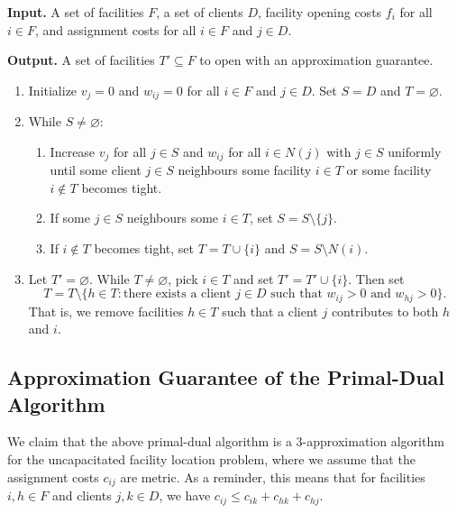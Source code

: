 \begin{mdframed}[
    linewidth=1pt,
    linecolor=black,
    bottomline=false,topline=false,rightline=false,
    innerrightmargin=0pt,innertopmargin=0pt,innerbottommargin=0pt,
    innerleftmargin=1em,%
    skipabove=0.75\baselineskip
]
{\bf Input.} A set of facilities $F$, a set of clients $D$, facility 
opening costs $f_i$ for all $i \in F$, and assignment costs for all 
$i \in F$ and $j \in D$.

{\bf Output.} A set of facilities $T' \subseteq F$ to open with 
an approximation guarantee.
\begin{enumerate}[leftmargin=1.75cm, label={Step \arabic*.}]
    \item Initialize $v_j = 0$ and $w_{ij} = 0$ for all $i \in F$ and $j \in D$. 
    Set $S = D$ and $T = \varnothing$. 

    \item While $S \neq \varnothing$:
    \begin{enumerate}[label={Step 2.\arabic*.}]
        \item Increase $v_j$ for all $j \in S$ and
        $w_{ij}$ for all $i \in N(j)$ with $j \in S$ uniformly 
        until some client $j \in S$ neighbours some facility $i \in T$ or 
        some facility $i \notin T$ becomes tight. 

        \item If some $j \in S$ neighbours some $i \in T$, set 
        $S = S \setminus \{j\}$. 

        \item If $i \notin T$ becomes tight, set $T = T \cup \{i\}$ and 
        $S = S \setminus N(i)$.
    \end{enumerate}

    \item Let $T' = \varnothing$. While $T \neq \varnothing$, pick $i \in T$ 
    and set $T' = T' \cup \{i\}$. Then set 
    \[ T = T \setminus \{h \in T : \text{there exists a client $j \in D$ 
    such that $w_{ij} > 0$ and $w_{hj} > 0$}\}. \] 
    That is, we remove facilities $h \in T$ such that a client $j$ 
    contributes to both $h$ and $i$. 
\end{enumerate}
\end{mdframed}\vspace{-0.25cm}

\subsection{Approximation Guarantee of the Primal-Dual Algorithm} \label{subsec:8.3}
We claim that the above primal-dual algorithm is a $3$-approximation algorithm for 
the uncapacitated facility location problem, where we assume 
that the assignment costs $c_{ij}$ are metric. As a reminder, 
this means that for facilities $i, h \in F$ and clients $j, k \in D$, we have 
$c_{ij} \leq c_{ik} + c_{hk} + c_{hj}$.


